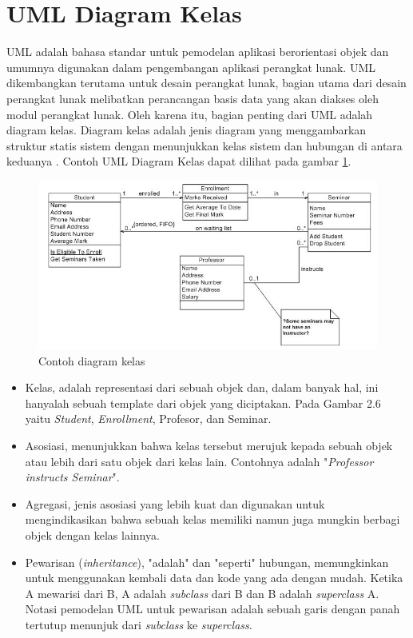 \section{UML Diagram Kelas}
UML adalah bahasa standar untuk pemodelan aplikasi berorientasi objek dan umumnya digunakan dalam pengembangan aplikasi perangkat lunak. UML dikembangkan terutama untuk desain perangkat lunak, bagian utama dari desain perangkat lunak melibatkan perancangan basis data yang akan diakses oleh modul perangkat lunak. Oleh karena itu, bagian penting dari UML adalah diagram kelas. Diagram kelas adalah jenis diagram yang menggambarkan struktur statis sistem dengan menunjukkan kelas sistem dan hubungan di antara keduanya \citep{soler2010}. Contoh UML Diagram Kelas dapat dilihat pada gambar \ref{diagkelas}.

\begin{figure}[H]
	\centering
	\includegraphics[width=\linewidth]{gambar/diagramkelas}
	\caption{Contoh diagram kelas }
	\label{diagkelas}
\end{figure}

\begin{itemize}
	\item Kelas, adalah representasi dari sebuah objek dan, dalam banyak hal, ini hanyalah sebuah template dari objek yang diciptakan. Pada Gambar 2.6 yaitu \textit{Student}, \textit{Enrollment}, Profesor, dan Seminar.
	\item Asosiasi, menunjukkan bahwa kelas tersebut merujuk kepada sebuah objek atau lebih dari satu objek dari kelas lain. Contohnya adalah "\textit{Professor instructs Seminar}".
	\item Agregasi, jenis asosiasi yang lebih kuat dan digunakan untuk mengindikasikan bahwa sebuah kelas memiliki namun juga mungkin berbagi objek dengan kelas lainnya.
	\item Pewarisan (\textit{inheritance}), "adalah" dan "seperti" hubungan, memungkinkan untuk menggunakan kembali data dan kode yang ada dengan mudah. Ketika A mewarisi dari B, A adalah \textit{subclass} dari B dan B adalah \textit{superclass} A. Notasi pemodelan UML untuk pewarisan adalah sebuah garis dengan panah tertutup menunjuk dari \textit{subclass} ke \textit{superclass}.
\end{itemize}

